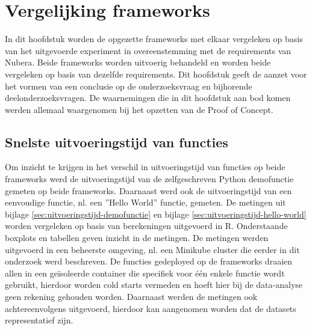 \chapter{Vergelijking frameworks}
\label{ch:vergelijking-frameworks}
In dit hoofdstuk worden de opgezette frameworks met elkaar vergeleken op basis van het uitgevoerde experiment in overeenstemming met de requirements van Nubera. Beide frameworks worden uitvoerig behandeld en worden beide vergeleken op basis van dezelfde requirements. Dit hoofdstuk geeft de aanzet voor het vormen van een conclusie op de onderzoeksvraag en bijhorende deelonderzoeksvragen. De waarnemingen die in dit hoofdstuk aan bod komen werden allemaal waargenomen bij het opzetten van de Proof of Concept.

\section{Snelste uitvoeringstijd van functies}
Om inzicht te krijgen in het verschil in uitvoeringstijd van functies op beide frameworks werd de uitvoeringstijd van de zelfgeschreven Python demofunctie gemeten op beide frameworks. Daarnaast werd ook de uitvoeringstijd van een eenvoudige functie, nl. een ''Hello World'' functie, gemeten. De metingen uit bijlage \ref{sec:uitvoeringstijd-demofunctie} en bijlage \ref{sec:uitvoeringstijd-hello-world} worden vergeleken op basis van  berekeningen uitgevoerd in R. Onderstaande boxplots en tabellen geven inzicht in de metingen. De metingen werden uitgevoerd in een beheerste omgeving, nl. een Minikube cluster die eerder in dit onderzoek werd beschreven. De functies gedeployed op de frameworks draaien allen in een geïsoleerde container die specifiek voor één enkele functie wordt gebruikt, hierdoor worden cold starts vermeden en hoeft hier bij de data-analyse geen rekening gehouden worden. Daarnaast werden de metingen ook achtereenvolgens uitgevoerd, hierdoor kan aangenomen worden dat de datasets representatief zijn.

\newpage
